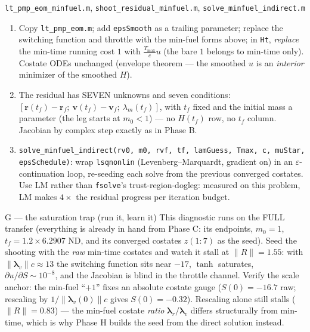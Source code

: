 \documentclass[11pt,letterpaper]{article}
\newcommand{\rvec}{\mathbf{r}}
\newcommand{\vvec}{\mathbf{v}}
\newcommand{\lamr}{\bm{\lambda}_r}
\newcommand{\lamv}{\bm{\lambda}_v}
\newcommand{\lamm}{\lambda_m}
\begin{document}
\begin{exercise}{\texttt{lt\_pmp\_eom\_minfuel.m}, \texttt{shoot\_residual\_minfuel.m}, \texttt{solve\_minfuel\_indirect.m}}
\begin{enumerate}[leftmargin=1.5em,nosep]
\item Copy \texttt{lt\_pmp\_eom.m}; add \texttt{epsSmooth} as a trailing
      parameter; replace the switching function and throttle with the
      min-fuel forms above; in \texttt{Ht}, \emph{replace} the min-time
      running cost $1$ with $\tfrac{T_{\max}}{c}u$ (the bare $1$ belongs
      to min-time only). Costate ODEs unchanged (envelope theorem ---
      the smoothed $u$ is an \emph{interior} minimizer of the smoothed
      $H$).
\item The residual has SEVEN unknowns and seven conditions:
      $[\rvec(t_f)-\rvec_f;\ \vvec(t_f)-\vvec_f;\ \lamm(t_f)]$, with
      $t_f$ fixed and the initial mass a parameter (the leg starts at
      $m_0 < 1$) --- no $H(t_f)$ row, no $t_f$ column. Jacobian by
      complex step exactly as in Phase B.
\item \texttt{solve\_minfuel\_indirect(rv0, m0, rvf, tf, lamGuess,
      Tmax, c, muStar, epsSchedule)}: wrap \texttt{lsqnonlin}
      (Levenberg--Marquardt, gradient on) in an
      $\varepsilon$-continuation loop, re-seeding each solve from the
      previous converged costates. Use LM rather than \texttt{fsolve}'s
      trust-region-dogleg: measured on this problem, LM makes $4\times$
      the residual progress per iteration budget.
\end{enumerate}
\end{exercise}

\begin{checkpoint}{G --- the saturation trap (run it, learn it)}
This diagnostic runs on the FULL transfer (everything is already in
hand from Phase C: its endpoints, $m_0 = 1$, $t_f = 1.2 \times 6.2907$
ND, and its converged costates $z(1{:}7)$ as the seed). Seed the
shooting with the \emph{raw} min-time costates and watch it stall at
$\|R\| = 1.55$: with $\|\lamv\|c \approx 13$ the switching function sits
near $-17$, $\tanh$ saturates, $\partial u/\partial S \sim 10^{-8}$, and
the Jacobian is blind in the throttle channel. Verify the scale anchor:
the min-fuel ``$+1$'' fixes an absolute costate gauge
($S(0) = -16.7$ raw; rescaling by $1/\|\lamv(0)\|c$ gives
$S(0) = -0.32$). Rescaling alone still stalls ($\|R\| = 0.83$) --- the
min-fuel costate \emph{ratio} $\lamr/\lamv$ differs structurally from
min-time, which is why Phase H builds the seed from the direct solution
instead.
\end{checkpoint}
\end{document}
